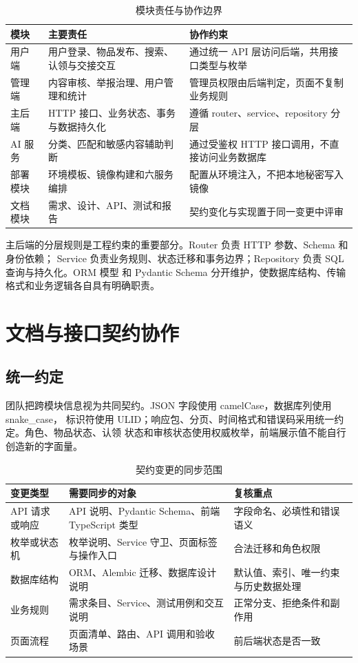 \begin{table}[H]
  \centering
  \caption{模块责任与协作边界}
  \begin{tabularx}{\textwidth}{L{3.0cm}L{4.4cm}Y}
    \toprule
    模块 & 主要责任 & 协作约束 \\
    \midrule
    用户端 & 用户登录、物品发布、搜索、认领与交接交互 & 通过统一 API 层访问后端，共用接口类型与枚举 \\
    管理端 & 内容审核、举报治理、用户管理和统计 & 管理员权限由后端判定，页面不复制业务规则 \\
    主后端 & HTTP 接口、业务状态、事务与数据持久化 & 遵循 router、service、repository 分层 \\
    AI 服务 & 分类、匹配和敏感内容辅助判断 & 通过受鉴权 HTTP 接口调用，不直接访问业务数据库 \\
    部署模块 & 环境模板、镜像构建和六服务编排 & 配置从环境注入，不把本地秘密写入镜像 \\
    文档模块 & 需求、设计、API、测试和报告 & 契约变化与实现置于同一变更中评审 \\
    \bottomrule
  \end{tabularx}
\end{table}

主后端的分层规则是工程约束的重要部分。Router 负责 HTTP 参数、Schema 和身份依赖；
Service 负责业务规则、状态迁移和事务边界；Repository 负责 SQL 查询与持久化。ORM 模型
和 Pydantic Schema 分开维护，使数据库结构、传输格式和业务逻辑各自具有明确职责。

\section{文档与接口契约协作}

\subsection{统一约定}

团队把跨模块信息视为共同契约。JSON 字段使用 camelCase，数据库列使用 snake\_case，
标识符使用 ULID；响应包、分页、时间格式和错误码采用统一约定。角色、物品状态、认领
状态和审核状态使用权威枚举，前端展示值不能自行创造新的字面量。

\begin{table}[H]
  \centering
  \caption{契约变更的同步范围}
  \begin{tabularx}{\textwidth}{L{3.0cm}Y Y}
    \toprule
    变更类型 & 需要同步的对象 & 复核重点 \\
    \midrule
    API 请求或响应 & API 说明、Pydantic Schema、前端 TypeScript 类型 & 字段命名、必填性和错误语义 \\
    枚举或状态机 & 枚举说明、Service 守卫、页面标签与操作入口 & 合法迁移和角色权限 \\
    数据库结构 & ORM、Alembic 迁移、数据库设计说明 & 默认值、索引、唯一约束与历史数据处理 \\
    业务规则 & 需求条目、Service、测试用例和交互说明 & 正常分支、拒绝条件和副作用 \\
    页面流程 & 页面清单、路由、API 调用和验收场景 & 前后端状态是否一致 \\
    \bottomrule
  \end{tabularx}
\end{table}

